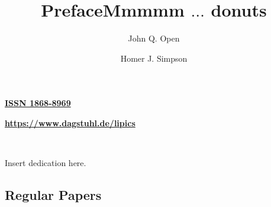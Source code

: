 \documentclass[a4paper,UKenglish]{lipicsmaster-v2021}
\begin{document}
\begin{publicationinfo}
\bigskip
\bigskip
\bigskip

{\large\bfseries\sffamily \href{https://www.dagstuhl.de/dagpub/1868-8969}{ISSN 1868-8969}}

\bigskip
\bigskip
\bigskip

{\Large\bfseries\sffamily \href{https://www.dagstuhl.de/lipics}{https://www.dagstuhl.de/lipics}}

\vfill


\newpage

\thispagestyle{empty}

\ \\

\end{publicationinfo}


\begin{dedication}
Insert dedication here.
\end{dedication}


\begin{contentslist}



\contitem
\title{Preface}
\author{John Q. Open}

\part{Regular Papers}

\contitem
\title{Mmmmm $\ldots$ donuts}
\author{Homer J. Simpson}


\end{contentslist}
\end{document}
